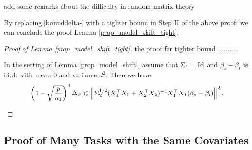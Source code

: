 {\cor add some remarks about the difficulty in random matrix theory}

By replacing \eqref{bounddelta-} with a tighter bound in Step II of the above proof, we can conclude the proof Lemma \ref{prop_model_shift_tight}.

\begin{proof}[Proof of Lemma \ref{prop_model_shift_tight}]
the proof for tighter bound ........... 


\begin{lemma}\label{prop_model_shift222}
	In the setting of Lemma \ref{prop_model_shift}, assume that $\Sigma_1 = \operatorname{Id}$ and $\beta_s - \beta_t$ is i.i.d. with mean $0$ and variance $d^2$. Then we have
	\begin{align*}
		\left({1 - \sqrt{\frac{p}{n_1}}}\right)^4 \Delta_{\beta}
		\leqslant \left\| \Sigma_2^{1/2} (X_1^{\top}X_1 + X_2^{\top}X_2)^{-1}X_1^{\top}X_1(\beta_s - \beta_t) \right\|^2.
	\end{align*}
\end{lemma}

\end{proof}



\subsection{Proof of Many Tasks with the Same Covariates}\label{app_proof_many_tasks}


